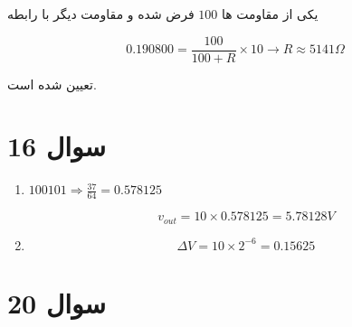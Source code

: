 \documentclass[12pt]{article}
\begin{document}
یکی از مقاومت ها $100$ فرض شده و مقاومت دیگر با رابطه

$$0.190800 = \frac{100}{100+R} \times 10 \rightarrow R \approx 5141 \Omega$$

تعیین شده است.



\section*{سوال 16}

\begin{enumerate}[label = \harfi*)]
	\item
$100101 \Rightarrow \frac{37}{64} = 0.578125$

$$v_{out} = 10 \times 0.578125 = 5.78128 V $$

\item

$$\Delta V = 10 \times 2^{-6} = 0.15625$$
\end{enumerate}
\section*{سوال 20}
\end{document}

